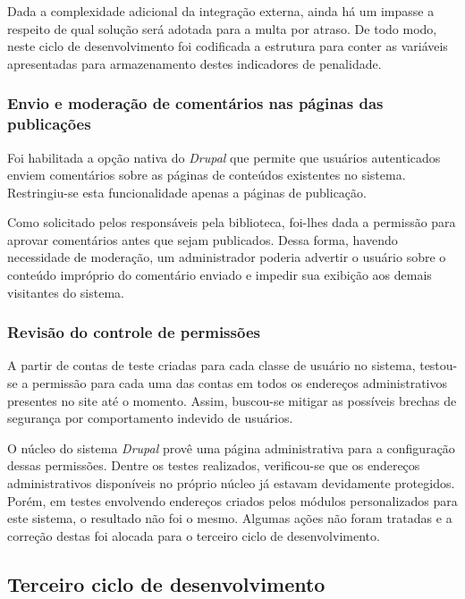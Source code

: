 \documentclass[a4paper]{article}
\begin{document}
Dada a complexidade adicional da integração externa, ainda há um impasse a respeito de qual solução será adotada para a multa por atraso. De todo modo, neste ciclo de desenvolvimento foi codificada a estrutura para conter as variáveis apresentadas para armazenamento destes indicadores de penalidade.

\subsubsection{Envio e moderação de comentários nas páginas das publicações}

Foi habilitada a opção nativa do \textit{Drupal} que permite que usuários autenticados enviem comentários sobre as páginas de conteúdos existentes no sistema. Restringiu-se esta funcionalidade apenas a páginas de publicação.

Como solicitado pelos responsáveis pela biblioteca, foi-lhes dada a permissão para aprovar comentários antes que sejam publicados. Dessa forma, havendo necessidade de moderação, um administrador poderia advertir o usuário sobre o conteúdo impróprio do comentário enviado e impedir sua exibição aos demais visitantes do sistema.

\subsubsection{Revisão do controle de permissões}

A partir de contas de teste criadas para cada classe de usuário no sistema, testou-se a permissão para cada uma das contas em todos os endereços administrativos presentes no site até o momento. Assim, buscou-se mitigar as possíveis brechas de segurança por comportamento indevido de usuários.

O núcleo do sistema \textit{Drupal} provê uma página administrativa para a configuração dessas permissões. Dentre os testes realizados, verificou-se que os endereços administrativos disponíveis no próprio núcleo já estavam devidamente protegidos. Porém, em testes envolvendo endereços criados pelos módulos personalizados para este sistema, o resultado não foi o mesmo. Algumas ações não foram tratadas e a correção destas foi alocada para o terceiro ciclo de desenvolvimento.


\pagebreak
\subsection{Terceiro ciclo de desenvolvimento}
\end{document}

